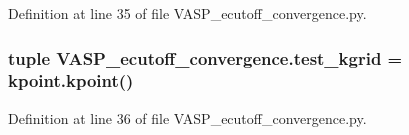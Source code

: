 Definition at line 35 of file V\+A\+S\+P\+\_\+ecutoff\+\_\+convergence.\+py.

\hypertarget{namespace_v_a_s_p__ecutoff__convergence_a8a9d3a7f5f06ab4f838741c9467dd4f4}{
\subsubsection[{test\+\_\+kgrid}]{\setlength{\rightskip}{0pt plus 5cm}tuple V\+A\+S\+P\+\_\+ecutoff\+\_\+convergence.\+test\+\_\+kgrid = kpoint.\+kpoint()}}\label{namespace_v_a_s_p__ecutoff__convergence_a8a9d3a7f5f06ab4f838741c9467dd4f4}


Definition at line 36 of file V\+A\+S\+P\+\_\+ecutoff\+\_\+convergence.\+py.

